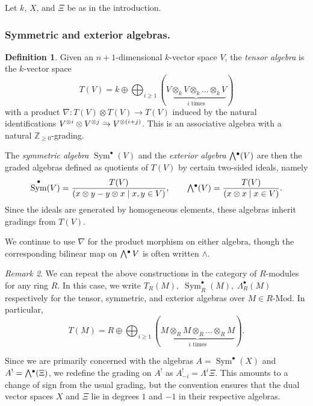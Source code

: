 \documentclass[a4paper]{article}
\theoremstyle{definition}
\newtheorem{defn}{Definition}[section]
\theoremstyle{remark}
\newtheorem{remark}[defn]{Remark}
\newcommand{\simrightarrow}{\mathrel{\ooalign{
     $\to$\cr
     \hidewidth\raise.3em\hbox{$\scaleobj{.7}{\sim}\mkern7mu$}\cr
    }
  }
}
\newcommand{\Exter}{\mathchoice{{\textstyle\bigwedge}}%
    {{\bigwedge}}%
    {{\textstyle\wedge}}%
    {{\scriptstyle\wedge}}}
\newcommand{\Mod}{\ensuremath{\text{-Mod}}}
\DeclareMathOperator{\Sym}{\text{Sym}}
\DeclareMathOperator{\exterior}{\Exter^\bullet}
\begin{document}
Let \(k\), \(X\), and \(\Xi\) be as in the introduction.

\subsubsection{Symmetric and exterior algebras.} 

\begin{defn} 
    Given an \(n+1\)-dimensional \(k\)-vector space \(V\), the \textit{tensor
    algebra} is the \(k\)-vector space 
    \[ T(V) = k \oplus \bigoplus_{i\geq 1}(\underbrace{V\otimes_k V\otimes_k ...
    \otimes_k V}_{i\text{ times}})\] 
    with a product \(\nabla: T(V)\otimes T(V) \rightarrow T(V)\) induced by the
    natural identifications \(V^{\otimes i}\otimes V^{\otimes j} \simrightarrow
    V^{\otimes(i+j)}\). This is an associative algebra with a natural
    \(\mathbb{Z}_{\geq 0}\)-grading. 

    The \textit{symmetric algebra} \(\Sym^\bullet(V)\) and the \textit{exterior
    algebra} \(\exterior(V)\) are then the graded algebras defined as quotients
    of \(T(V)\) by certain two-sided ideals, namely 
    \[\Sym^\bullet(V) = \frac{T(V)}{(x\otimes y - y\otimes x \;|\; x,y\in V)},
    \qquad \exterior(V) = \frac{T(V)}{(x\otimes x \;|\; x\in V)}.\] 
    Since the ideals are generated by homogeneous elements, these algebras
    inherit gradings from \(T(V)\).
\end{defn}

We continue to use \(\nabla\) for the product morphism on either algebra,
though the corresponding bilinear map on \(\exterior{V}\) is often written
\(\wedge\).

\begin{remark} 
    We can repeat the above constructions in the category of \(R\)-modules for
    any ring \(R\). In this case, we write \(T_R(M),\; \Sym^\bullet_R(M),\;
    \Lambda^\bullet_R(M)\) respectively for the tensor, symmetric, and exterior
    algebras over \(M\in R\Mod\). In particular,
    \[ T(M) = R \oplus \bigoplus_{i\geq 1}(\underbrace{M\otimes_R M\otimes_R ...
    \otimes_R M}_{i\text{ times}}).\]
\end{remark}

Since we are primarily concerned with the algebras \(A=\Sym^\bullet(X)\) and
\(A^!=\exterior(\Xi)\), we redefine the grading on \(A^!\) as
\(A^!_{-i}=\Lambda^i \Xi\). This amounts to a change of sign from the usual
grading, but the convention ensures that the dual vector spaces \(X\) and
\(\Xi\) lie in degrees \(1\) and \(-1\) in their respective algebras.
\end{document}
